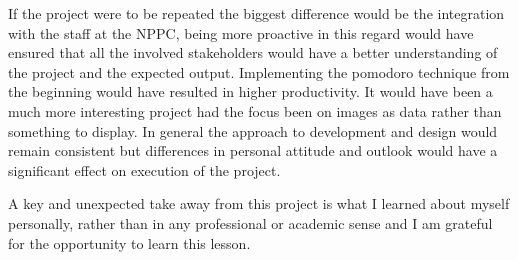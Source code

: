 If the project were to be repeated the biggest difference would be the integration with the staff at the NPPC, being more proactive in this regard would have ensured that all the involved stakeholders would have a better understanding of the project and the expected output. Implementing the pomodoro technique from the beginning would have resulted in higher productivity. It would have been a much more interesting project had the focus been on images as data rather than something to display. In general the approach to development and design would remain consistent but differences in personal attitude and outlook would have a significant effect on execution of the project.

 A key and unexpected take away from this project is what I learned about myself personally, rather than in any professional or academic sense and I am grateful for the opportunity to learn this lesson.


